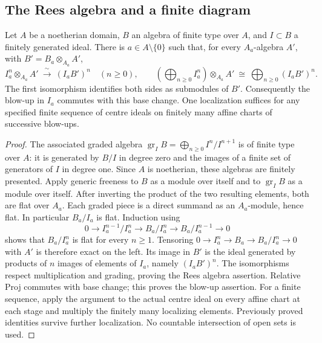 \subsection{The Rees algebra and a finite diagram}
\begin{lemma}\label{lem:rees}
Let $A$ be a noetherian domain, $B$ an algebra of finite type over $A$,
and $I\subset B$ a finitely generated ideal. There is $a\in A\setminus\{0\}$
such that, for every $A_a$-algebra $A'$, with $B'=B_a\otimes_{A_a}A'$,
\[
 I_a^n\otimes_{A_a}A'\ \xrightarrow{\ \sim\ }\ (I_aB')^n
 \quad(n\ge0),\qquad
 \left(\bigoplus_{n\ge0}I_a^n\right)\otimes_{A_a}A'
      \ \cong\ \bigoplus_{n\ge0}(I_aB')^n.
\]
The first isomorphism identifies both sides as submodules of $B'$.
Consequently the blow-up in $I_a$ commutes with this base change. One
localization suffices for any specified finite sequence of centre ideals
on finitely many affine charts of successive blow-ups.
\end{lemma}
\begin{proof}
The associated graded algebra
$\operatorname{gr}_I B=\bigoplus_{n\ge0}I^n/I^{n+1}$ is of finite type
over $A$: it is generated by $B/I$ in degree zero and the images of a
finite set of generators of $I$ in degree one. Since $A$ is noetherian,
these algebras are finitely presented. Apply generic freeness
\cite[Tag 051S]{Stacks} to $B$ as a module over itself and to
$\operatorname{gr}_I B$ as a module over itself. After inverting the
product of the two resulting elements, both are flat over $A_a$.
Each graded piece is a direct summand as an $A_a$-module, hence flat.
In particular $B_a/I_a$ is flat. Induction using
\[
 0\longrightarrow I_a^{n-1}/I_a^n\longrightarrow B_a/I_a^n
       \longrightarrow B_a/I_a^{n-1}\longrightarrow0
\]
shows that $B_a/I_a^n$ is flat for every $n\ge1$.
Tensoring $0\to I_a^n\to B_a\to B_a/I_a^n\to0$ with $A'$ is
therefore exact on the left. Its image in $B'$ is the ideal generated
by products of $n$ images of elements of $I_a$, namely $(I_aB')^n$.
The isomorphisms respect multiplication and grading, proving the Rees
algebra assertion. Relative Proj commutes with base change; this proves
the blow-up assertion. For a finite sequence, apply the argument to the
actual centre ideal on every affine chart at each stage and multiply the
finitely many localizing elements. Previously proved identities survive
further localization. No countable intersection of open sets is used.
\end{proof}

